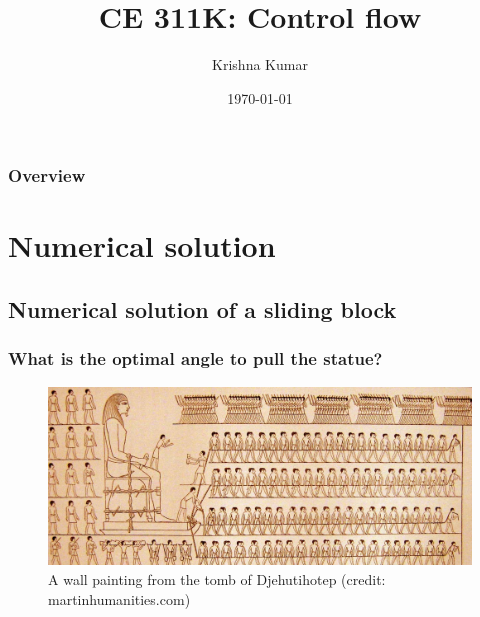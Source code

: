 \documentclass[notes]{beamer}
\title[CE 311K: Control flow]{CE 311K: Control flow}
\author{Krishna Kumar} %
\institute[UT Austin] %
{
University of Texas at Austin \\
\medskip
\href{mailto:krishnak@utexas.edu}{krishnak@utexas.edu} %
}
\date{\today} %
\begin{document}
\begin{frame}
\titlepage %
\end{frame}

\begin{frame}
 \frametitle{Overview}
 \tableofcontents
\end{frame}

\newif\ifshowtoc
\showtoctrue%

\AtBeginSection{%
	\ifshowtoc
	\begin{frame}
		\tableofcontents[currentsection, subsectionstyle=show/show/hide]
	\end{frame}
	\fi
}


\section{Numerical solution}
\subsection{Numerical solution of a sliding block}
\begin{frame}
	\frametitle{What is the optimal angle to pull the statue?}
	\begin{figure}[ht]
		\centering
		\includegraphics[width=\textwidth]{figs/egypt-pyramid.jpg}
		\caption*{A wall painting from the tomb of Djehutihotep (credit: martinhumanities.com)}
	\end{figure}
\end{frame}
\end{document}

